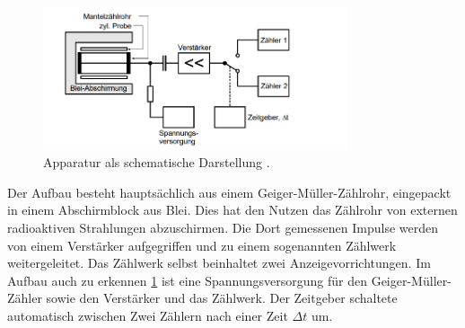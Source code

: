 \begin{figure}
  \centering
  \includegraphics[width=0.8\textwidth]{bilder/Schematische Darstellung des Versuchsaufbaus.png}
  \caption{Apparatur als schematische Darstellung \cite{skript}.}
  \label{fig:aufbau}
\end{figure}
Der Aufbau besteht hauptsächlich aus einem Geiger-Müller-Zählrohr, eingepackt in einem Abschirmblock aus Blei. Dies hat den Nutzen das Zählrohr von externen 
radioaktiven Strahlungen abzuschirmen. Die Dort gemessenen Impulse werden von einem Verstärker aufgegriffen und zu einem sogenannten Zählwerk weitergeleitet. 
Das Zählwerk selbst beinhaltet zwei Anzeigevorrichtungen. 
Im Aufbau auch zu erkennen \ref{fig:aufbau} ist eine Spannungsversorgung für den Geiger-Müller-Zähler sowie den Verstärker und das Zählwerk. 
Der Zeitgeber schaltete automatisch zwischen Zwei Zählern nach einer Zeit $\Delta t$ um.

